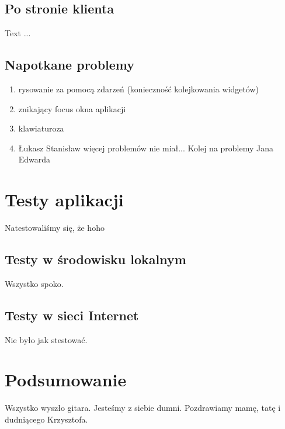 \documentclass[polish]{inz}
\begin{document}
\section{Po stronie klienta}
Text ...

\section{Napotkane problemy}
\begin{enumerate}
  \item rysowanie za pomocą zdarzeń (konieczność kolejkowania widgetów)
  \item znikający focus okna aplikacji
  \item klawiaturoza
  \item Łukasz Stanisław więcej problemów nie miał... Kolej na problemy Jana Edwarda
\end{enumerate}

\chapter{Testy aplikacji}
Natestowaliśmy się, że hoho

\section{Testy w środowisku lokalnym}
Wszystko spoko.

\section{Testy w sieci Internet}
Nie było jak stestować.

\chapter{Podsumowanie}
Wszystko wyszło gitara. Jesteśmy z siebie dumni. Pozdrawiamy mamę, tatę i dudniącego Krzysztofa.

\printindex
\end{document}
